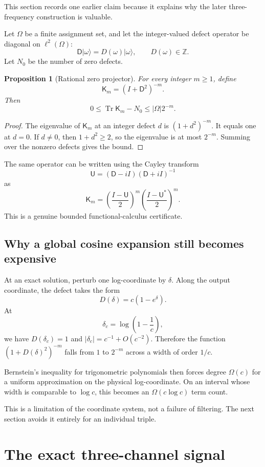 \documentclass[11pt]{article}
\newtheorem{proposition}[theorem]{Proposition}
\newcommand{\Tr}{\operatorname{Tr}}
\newcommand{\Z}{\mathbb Z}
\begin{document}
This section records one earlier claim because it explains why the later three-frequency construction is valuable.

Let $\Omega$ be a finite assignment set, and let the integer-valued defect operator be diagonal on $\ell^2(\Omega)$:
\[
  \mathsf D|\omega\rangle=D(\omega)|\omega\rangle,
  \qquad D(\omega)\in\Z.
\]
Let $N_0$ be the number of zero defects.

\begin{proposition}[Rational zero projector]
For every integer $m\geq1$, define
\[
  \mathsf K_m=(I+\mathsf D^2)^{-m}.
\]
Then
\[
  0\leq \Tr\mathsf K_m-N_0\leq |\Omega|2^{-m}.
\]
\end{proposition}

\begin{proof}
The eigenvalue of $\mathsf K_m$ at an integer defect $d$ is $(1+d^2)^{-m}$.  It equals one at $d=0$.  If $d\neq0$, then $1+d^2\geq2$, so the eigenvalue is at most $2^{-m}$.  Summing over the nonzero defects gives the bound.
\end{proof}

The same operator can be written using the Cayley transform
\[
  \mathsf U=(\mathsf D-iI)(\mathsf D+iI)^{-1}
\]
as
\[
  \mathsf K_m=
  \left(\frac{I-\mathsf U}{2}\right)^m
  \left(\frac{I-\mathsf U^*}{2}\right)^m.
\]
This is a genuine bounded functional-calculus certificate.

\subsection{Why a global cosine expansion still becomes expensive}

At an exact solution, perturb one log-coordinate by $\delta$.  Along the output coordinate, the defect takes the form
\[
  D(\delta)=c(1-e^\delta).
\]
At
\[
  \delta_c=\log\left(1-\frac1c\right),
\]
we have $D(\delta_c)=1$ and $|\delta_c|=c^{-1}+O(c^{-2})$.  Therefore the function $(1+D(\delta)^2)^{-m}$ falls from $1$ to $2^{-m}$ across a width of order $1/c$.

Bernstein's inequality for trigonometric polynomials then forces degree $\Omega(c)$ for a uniform approximation on the physical log-coordinate.  On an interval whose width is comparable to $\log c$, this becomes an $\Omega(c\log c)$ term count.

This is a limitation of the coordinate system, not a failure of filtering.  The next section avoids it entirely for an individual triple.

\section{The exact three-channel signal}\label{sec:three-channel}
\end{document}
